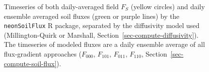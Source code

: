\documentclass[
  letterpaper,
  DIV=11,
  numbers=noendperiod]{scrartcl}
\begin{document}
\begin{figure}


\caption{\label{fig-flux-results-year}Timeseries of both daily-averaged
field \(F_{S}\) (yellow circles) and daily ensemble averaged soil fluxes
(green or purple lines) by the \texttt{neonSoilFlux} R package,
separated by the diffusivity model used (Millington-Quirk or Marshall,
Section~\ref{sec-compute-diffusivity}). The timeseries of modeled fluxes
are a daily ensemble average of all flux-gradient approaches
(\(F_{000}\), \(F_{101}\), \(F_{011}\), \(F_{110}\),
Section~\ref{sec-compute-soil-flux}).}

\end{figure}%
\end{document}
